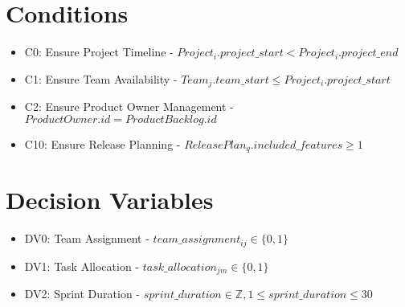 \documentclass{article}
\begin{document}
\section{Conditions}
\begin{itemize}
    \item C0: Ensure Project Timeline - $Project_{i}.project\_start < Project_{i}.project\_end$
    \item C1: Ensure Team Availability - $Team_{j}.team\_start \leq Project_{i}.project\_start$
    \item C2: Ensure Product Owner Management - $ProductOwner.id = ProductBacklog.id$
    \item C10: Ensure Release Planning - $ReleasePlan_{q}.included\_features \geq 1$
\end{itemize}

\section{Decision Variables}
\begin{itemize}
    \item DV0: Team Assignment - $team\_assignment_{ij} \in \{0,1\}$
    \item DV1: Task Allocation - $task\_allocation_{jm} \in \{0,1\}$
    \item DV2: Sprint Duration - $sprint\_duration \in \mathbb{Z}, 1 \leq sprint\_duration \leq 30$
\end{itemize}
\end{document}
